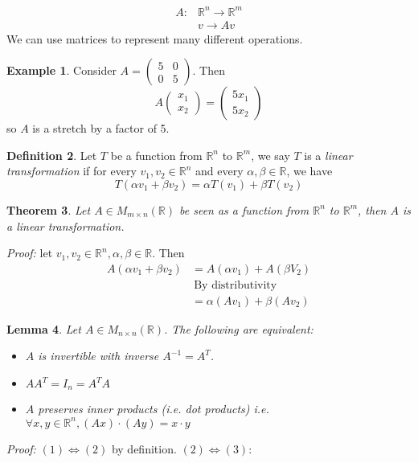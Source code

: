 \documentclass{report}
\newtheorem{theorem}{Theorem}[subsection]
\newtheorem{lemma}[theorem]{Lemma}
\theoremstyle{remark}
\theoremstyle{definition}
\newtheorem{definition}[theorem]{Definition}
\theoremstyle{definition}
\newtheorem{example}[theorem]{Example}
\theoremstyle{theorem}
\begin{document}
\begin{align*}
    A:& \mathbb{R}^n \rightarrow \mathbb{R}^m\\
    &v \rightarrow Av
\end{align*}
We can use matrices to represent many different operations.
\begin{example}
Consider $A = \begin{pmatrix}
5&0\\
0&5
\end{pmatrix}$. Then
\[A\begin{pmatrix}x_1 \\x_2 \end{pmatrix} = \begin{pmatrix}5x_1 \\ 5x_2\end{pmatrix} \]
so $A$ is a stretch by a factor of 5.
\end{example}
\begin{definition}
Let $T$ be a function from $\mathbb{R}^n$ to $\mathbb{R}^m$, we say $T$ is a \emph{linear transformation} if for every $v_1, v_2 \in \mathbb{R}^n$ and every $\alpha, \beta \in \mathbb{R}$, we have 
\[T(\alpha v_1 + \beta v_2) = \alpha T(v_1) + \beta T(v_2)\]
\end{definition}
\begin{theorem}
Let $A \in M_{m \times n}(\mathbb{R})$ be seen as a function from $\mathbb{R}^n$ to $\mathbb{R}^m$, then $A$ is a linear transformation.
\end{theorem}
\emph{Proof:} let $v_1, v_2 \in \mathbb{R}^n, \alpha, \beta \in \mathbb{R}$. Then
\begin{align*}
    A(\alpha v_1 + \beta v_2) &= A(\alpha v_1) + A( \beta V_2)\\
    & \> \text{By distributivity}\\
    &= \alpha(Av_1) + \beta(Av_2)
\end{align*}
\begin{lemma}
Let $A \in M_{n \times n}(\mathbb{R})$. The following are equivalent:
\begin{itemize}
    \item $A$ is invertible with inverse $A^{-1} = A^T$.
    \item $AA^T = I_n = A^TA$
    \item $A$ preserves inner products (i.e. dot products) i.e. $\forall x, y \in \mathbb{R}^n, (Ax) \cdot (Ay) = x \cdot y$
\end{itemize}
\end{lemma}
\emph{Proof:}
$(1) \iff (2)$ by definition. $(2) \iff (3)$:\par
\end{document}
